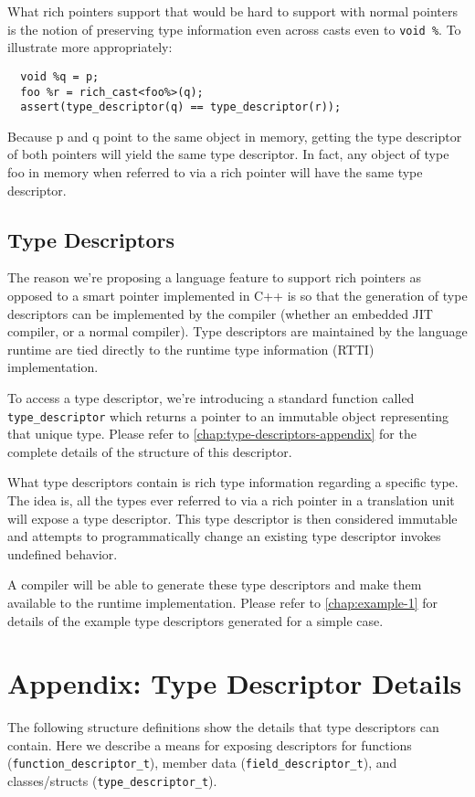 \documentclass[10pt,a4paper]{article}
\begin{document}
What rich pointers support that would be hard to support with normal pointers is
the notion of preserving type information even across casts even to
\verb+void %+. To illustrate more appropriately:

\begin{verbatim}
  void %q = p;
  foo %r = rich_cast<foo%>(q);
  assert(type_descriptor(q) == type_descriptor(r));
\end{verbatim}

Because p and q point to the same object in memory, getting the type descriptor
of both pointers will yield the same type descriptor. In fact, any object of
type foo in memory when referred to via a rich pointer will have the same type
descriptor.

\subsection{Type Descriptors}

The reason we’re proposing a language feature to support rich pointers as
opposed to a smart pointer implemented in C++ is so that the generation of type
descriptors can be implemented by the compiler (whether an embedded JIT
compiler, or a normal compiler). Type descriptors are maintained by the language
runtime are tied directly to the runtime type information (RTTI) implementation.

To access a type descriptor, we’re introducing a standard function called \\
\verb+type_descriptor+ which returns a pointer to an immutable object
representing that unique type. Please refer to
\autoref{chap:type-descriptors-appendix} for the complete details of the
structure of this descriptor.

What type descriptors contain is rich type information regarding a specific
type. The idea is, all the types ever referred to via a rich pointer in a
translation unit will expose a type descriptor. This type descriptor is then
considered immutable and attempts to programmatically change an existing type
descriptor invokes undefined behavior.

A compiler will be able to generate these type descriptors and make them
available to the runtime implementation. Please refer to
\autoref{chap:example-1} for details of the example type descriptors
generated for a simple case.

\appendix
\section{Appendix: Type Descriptor Details}
\label{chap:type-descriptors-appendix}
The following structure definitions show the details that type descriptors can
contain. Here we describe a means for exposing descriptors for functions
(\verb+function_descriptor_t+), member data (\verb+field_descriptor_t+), and
classes/structs (\verb+type_descriptor_t+).
\end{document}

